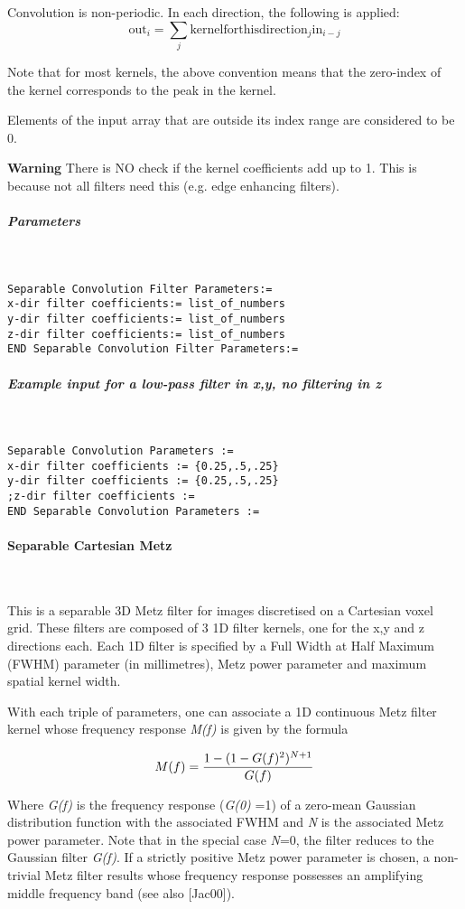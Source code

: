 \documentclass{article}
\newcommand{\subsubsubsection}[1]{\paragraph{#1}\mbox{} \\}
\newcommand{\subsubsubsubsection}[1]{\subparagraph{#1} \mbox{} \\}
\begin{document}
{{Convolution is non-periodic. In each direction, the following 
is applied: 
\[
\mathrm{out}_i = \sum_{j} \mathrm{kernelforthisdirection}_{j} \mathrm{in}_{i-j}
\]

Note that for most kernels, the above convention means that the 
zero-index of the kernel corresponds to the peak in the kernel. 



Elements of the input array that are outside its index range 
are considered to be 0. 


\textbf{Warning} There is NO check if the kernel coefficients add 
up to 1. This is because not all filters need this (e.g. edge 
enhancing filters).

{ \subsubsubsubsection{Parameters}
}
\begin{verbatim}
Separable Convolution Filter Parameters:=
x-dir filter coefficients:= list_of_numbers
y-dir filter coefficients:= list_of_numbers
z-dir filter coefficients:= list_of_numbers
END Separable Convolution Filter Parameters:=
\end{verbatim}

{ \subsubsubsubsection{Example input for a low-pass filter in x,y, no filtering 
in z}
}
\begin{verbatim}
Separable Convolution Parameters := 
x-dir filter coefficients := {0.25,.5,.25} 
y-dir filter coefficients := {0.25,.5,.25} 
;z-dir filter coefficients :=
END Separable Convolution Parameters :=
\end{verbatim}

{ \subsubsubsection{Separable Cartesian Metz}
}
This is a separable 3D Metz filter for images discretised on 
a Cartesian voxel grid. These filters are composed of 3 1D filter 
kernels, one for the x,y and z directions each. Each 1D filter 
is specified by a Full Width at Half Maximum (FWHM) parameter 
(in millimetres), Metz power parameter and maximum spatial kernel 
width. 



With each triple of parameters, one can associate a 1D continuous 
Metz filter kernel whose frequency response \textit{M(f)} is given 
by the formula

\[
M(f)=
{1-(1-G(f)^2)^{N+1}
\over
G(f)
}
\]

Where \textit{G(f)} is the frequency response (\textit{G(0)} =1) of a zero-mean 
Gaussian distribution function with the associated FWHM and \textit{N} 
is the associated Metz power parameter. Note that in the special 
case \textit{N}=0, the filter reduces to the Gaussian filter \textit{G(f)}. 
If a strictly positive Metz power parameter is chosen, a non-trivial 
Metz filter results whose frequency response possesses an amplifying 
middle frequency band (see also [Jac00]).



}}
\end{document}

